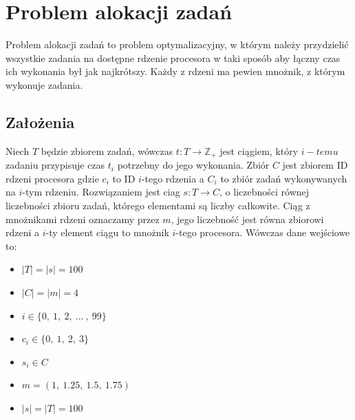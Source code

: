 \documentclass{article}
\begin{document}
	\section{Problem alokacji zadań}
	Problem alokacji zadań to problem optymalizacyjny, w którym należy przydzielić
	wszystkie zadania na dostępne rdzenie procesora w taki sposób aby łączny czas ich
	wykonania był jak najkrótszy. Każdy z rdzeni ma pewien mnożnik, z którym wykonuje
	zadania.
	\subsection{Założenia}
	Niech $T$ będzie zbiorem zadań, wówczas $t:T\rightarrow \mathbb{Z_+}$ jest ciągiem,
	który $i-temu$ zadaniu przypisuje czas $t_{i}$ potrzebny do jego wykonania. Zbiór
	$C$ jest zbiorem ID rdzeni procesora gdzie $c_{i}$ to ID $i$-tego rdzenia a $C_{i}$
	to zbiór zadań wykonywanych na $i$-tym rdzeniu. Rozwiązaniem jest ciag
	$s:T\rightarrow C$, o liczebności równej liczebności zbioru zadań, którego
	elementami są liczby całkowite. Ciąg z mnożnikami rdzeni oznaczamy przez $m$,
	jego liczebność jest równa zbiorowi rdzeni a $i$-ty element ciągu to mnożnik
	$i$-tego procesora. Wówczas dane wejściowe to:
	\begin{itemize}
		\item $|T|=|s|=100$

		\item $|C|=|m|=4$

		\item $i\in\{0,\ 1,\ 2,\ ...\ ,\ 99\}$

		\item $c_{i}\in\{0,\ 1,\ 2,\ 3\}$

		\item $s_{i}\in C$

		\item $m=(1,\ 1.25,\ 1.5,\ 1.75)$

		\item $|s|=|T|=100$
	\end{itemize}
\end{document}
